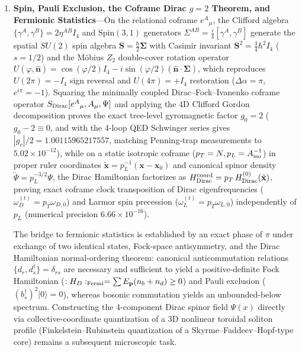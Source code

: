 \documentclass[11pt,a4paper]{article}
\begin{document}
\begin{enumerate}[label=\arabic*.]
\item \textbf{Spin, Pauli Exclusion, the Coframe Dirac $g=2$ Theorem, and Fermionic Statistics}---On the relational coframe $e^A{}_\mu$, the Clifford algebra $\{\gamma^A, \gamma^B\} = 2\eta^{AB}I_4$ and $\mathrm{Spin}(3,1)$ generators $\Sigma^{AB} = \frac{i}{4}[\gamma^A, \gamma^B]$ generate the spatial $SU(2)$ spin algebra $\mathbf{S} = \frac{\hbar}{2}\boldsymbol{\Sigma}$ with Casimir invariant $\mathbf{S}^2 = \frac{3}{4}\hbar^2 I_4$ ($s=1/2$) and the Möbius $Z_2$ double-cover rotation operator $U(\varphi, \hat{\mathbf{n}}) = \cos(\varphi/2)I_4 - i\sin(\varphi/2)(\hat{\mathbf{n}}\cdot\boldsymbol{\Sigma})$, which reproduces $U(2\pi) = -I_4$ sign reversal and $U(4\pi) = +I_4$ restoration ($\Delta\alpha = \pi$, $e^{i\pi} = -1$). Squaring the minimally coupled Dirac--Fock--Ivanenko coframe operator $S_{\rm Dirac}[e^A{}_\mu, A_\mu, \Psi]$ and applying the 4D Clifford Gordon decomposition proves the exact tree-level gyromagnetic factor \textbf{$g_0 = 2$} ($g_0 - 2 \equiv 0$, and with the 4-loop QED Schwinger series gives $|g_e|/2 = 1.00115965217557$, matching Penning-trap measurements to $5.02\times 10^{-12}$), while on a static isotropic coframe ($p_T = N, p_L = A_{\rm iso}^{-1}$) in proper ruler coordinates $\tilde{\mathbf{x}} = p_L^{-1}(\mathbf{x}-\mathbf{x}_0)$ and canonical spinor density $\widetilde{\Psi} = p_L^{-3/2}\Psi$, the Dirac Hamiltonian factorizes as $H_{\rm Dirac}^{\rm coord} = p_T\,H_{\rm Dirac}^{(0)}(\tilde{\mathbf{x}})$, proving exact coframe clock transposition of Dirac eigenfrequencies ($\omega_D^{(t)} = p_T\omega_{D,0}$) and Larmor spin precession ($\omega_L^{(t)} = p_T\omega_{L,0}$) independently of $p_L$ (numerical precision $6.66\times 10^{-16}$).

The bridge to fermionic statistics is established by an exact phase of $\pi$ under exchange of two identical states, Fock-space antisymmetry, and the Dirac Hamiltonian normal-ordering theorem: canonical anticommutation relations $\{d_r, d_s^\dagger\} = \delta_{rs}$ are necessary and sufficient to yield a positive-definite Fock Hamiltonian ($:H_D:_{\rm Fermi} = \sum E_{\mathbf{p}}(n_b + n_d) \ge 0$) and Pauli exclusion ($(b_s^\dagger)^2|0\rangle = 0$), whereas bosonic commutation yields an unbounded-below spectrum. Constructing the 4-component Dirac spinor field $\Psi(x)$ directly via collective-coordinate quantization of a 3D nonlinear toroidal soliton profile (Finkelstein--Rubinstein quantization of a Skyrme--Faddeev--Hopf-type core) remains a subsequent microscopic task.


\end{enumerate}
\end{document}
